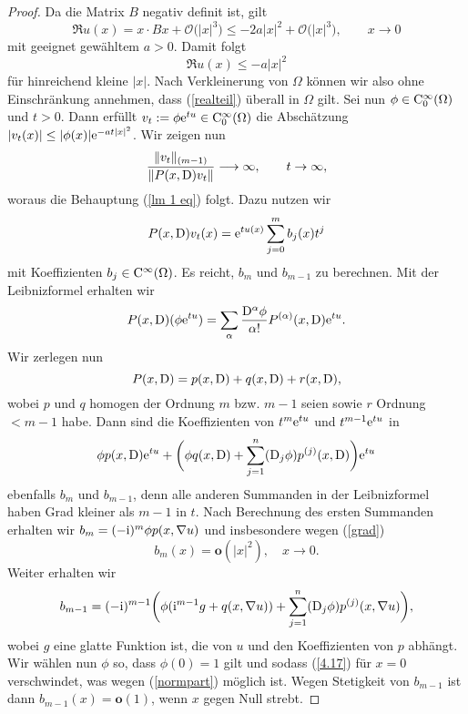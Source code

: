 \begin{proof}
Da die Matrix $B$ negativ definit ist, gilt
\begin{equation}
\Re u(x) = x\cdot Bx + \mathcal O\big(|x|^3\big) \le - 2 a |x|^2 + \mathcal O\big(|x|^3\big),\qquad x\to0
\end{equation}
mit geeignet gewähltem $a>0$. Damit folgt
\begin{equation}
\label{realteil}
\Re u(x) \le - a |x|^2 
\end{equation}
für hinreichend kleine $|x|$. Nach Verkleinerung von $\Omega$ können wir also ohne Einschränkung annehmen, dass (\ref{realteil}) überall in $\Omega$ gilt. 
%
Sei nun $\phi \in \mathrm C_0^\infty(\Omega)$ und $t>0$. Dann erfüllt $v_t := \phi \mathrm e^{tu} \in \mathrm C_0^\infty(\Omega)$ die Abschätzung $|v_t(x)| \le |\phi(x)| \mathrm e^{-at|x|^2}$. Wir zeigen nun
\begin{equation}
\frac{\lVert v_t \rVert_{(m-1)}}{\lVert P(x,\mathrm D)v_t \rVert} \longrightarrow \infty, \qquad t \rightarrow \infty,
\end{equation}
woraus die Behauptung (\ref{lm 1 eq}) folgt. Dazu nutzen wir
\begin{equation}
P(x,\mathrm D)v_t(x) = \mathrm e^{tu(x)} \sum_{j=0}^{m} b_j(x) t^j
\end{equation}
mit Koeffizienten $b_j\in\mathrm C^\infty(\Omega)$. Es reicht, $b_m$ und $b_{m-1}$ zu berechnen. Mit der Leibnizformel erhalten wir
\begin{equation}
P(x,\mathrm D)(\phi \mathrm e^{tu}) = \sum_{\alpha} \dfrac{\mathrm D^\alpha \phi}{\alpha!} P^{(\alpha)}(x,\mathrm D)\mathrm e^{tu}.
\end{equation}
Wir zerlegen nun
\begin{equation}
P(x,\mathrm D) = p(x,\mathrm D) + q(x,\mathrm D) + r(x,\mathrm D),
\end{equation}
wobei $p$ und $q$ homogen der Ordnung $m$ bzw. $m-1$ seien sowie $r$ Ordnung $<m-1$ habe. Dann sind die Koeffizienten von $t^m \mathrm e^{tu}$ und $t^{m-1} \mathrm e^{tu}$ in
\begin{equation}
\phi p(x,\mathrm D)\mathrm e^{tu} + \bigg( \phi q(x,\mathrm D) + \sum_{j=1}^{n} (\mathrm D_j \phi) p^{(j)}(x,\mathrm D) \bigg) \mathrm e^{tu}
\end{equation}
ebenfalls $b_m$ und $b_{m-1}$, denn alle anderen Summanden in der Leibnizformel haben Grad kleiner als $m-1$ in $t$. Nach Berechnung des ersten Summanden erhalten wir $b_m = (-\mathrm i)^m \phi p(x,\nabla u)$ und insbesondere wegen (\ref{grad})
\begin{equation}
b_m(x) = \mathbf{o} (|x|^2), \quad x \rightarrow 0.
\end{equation}
Weiter erhalten wir
\begin{equation}
	\label{4.17}
b_{m-1} = (-\mathrm i)^{m-1} \bigg( \phi (\mathrm i^{m-1}g + q(x,\nabla u)) + \sum_{j=1}^{n} (\mathrm D_j \phi) p^{(j)} (x,\nabla u) \bigg),
\end{equation}
wobei $g$ eine glatte Funktion ist, die von $u$ und den Koeffizienten von $p$ abhängt. Wir wählen nun $\phi$ so, dass $\phi(0) =1$ gilt und sodass (\ref{4.17}) für $x=0$ verschwindet, was wegen (\ref{normpart}) möglich ist. Wegen Stetigkeit von $b_{m-1}$ ist dann $b_{m-1}(x) = \mathbf{o}(1)$, wenn $x$ gegen Null strebt.


\end{proof}
